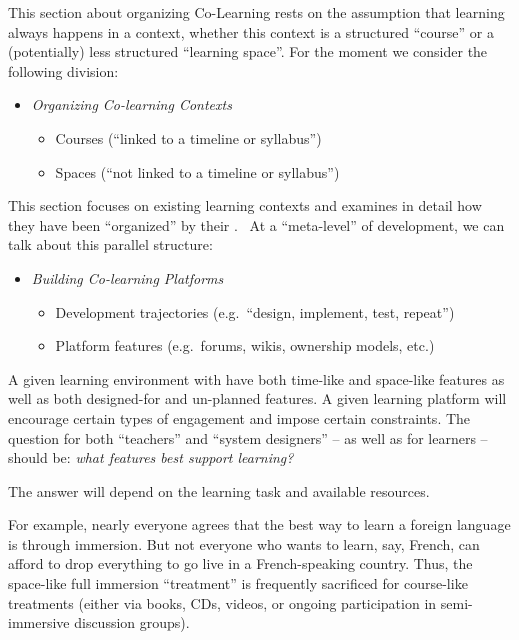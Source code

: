 This section about organizing Co-Learning rests on the assumption that
learning always happens in a context, whether this context is a
structured ``course'' or a (potentially) less structured ``learning
space''. For the moment we consider the following division:

\begin{itemize}
\itemsep1pt\parskip0pt
\item
  \emph{Organizing Co-learning Contexts}

  \begin{itemize}
  \itemsep1pt\parskip0pt
  \item
    Courses (``linked to a timeline or syllabus'')
  \item
    Spaces (``not linked to a timeline or syllabus'')
  \end{itemize}
\end{itemize}

This section focuses on existing learning contexts and examines in
detail how they have been ``organized'' by their .~ At a ``meta-level''
of development, we can talk about this parallel structure:

\begin{itemize}
\itemsep1pt\parskip0pt
\item
  \emph{Building Co-learning Platforms}

  \begin{itemize}
  \itemsep1pt\parskip0pt
  \item
    Development trajectories (e.g.~``design, implement, test, repeat'')
  \item
    Platform features (e.g.~forums, wikis, ownership models, etc.)
  \end{itemize}
\end{itemize}

A given learning environment with have both time-like and space-like
features as well as both designed-for and un-planned features. A given
learning platform will encourage certain types of engagement and impose
certain constraints. The question for both ``teachers'' and ``system
designers'' -- as well as for learners -- should be: \emph{what features
best support learning?}

The answer will depend on the learning task and available resources.

For example, nearly everyone agrees that the best way to learn a foreign
language is through immersion. But not everyone who wants to learn, say,
French, can afford to drop everything to go live in a French-speaking
country. Thus, the space-like full immersion ``treatment'' is frequently
sacrificed for course-like treatments (either via books, CDs, videos, or
ongoing participation in semi-immersive discussion groups).

